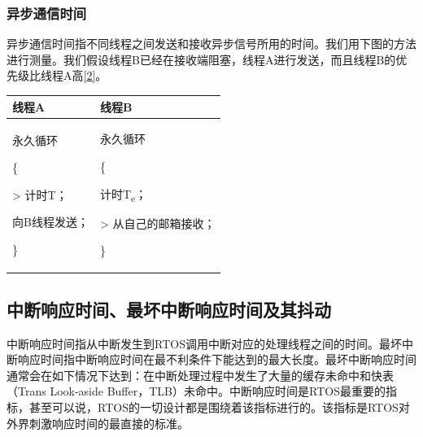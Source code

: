 \subsubsection{异步通信时间}\label{subsubsec:asynchronous-communication-time}

异步通信时间指不同线程之间发送和接收异步信号所用的时间。我们用下图的方法进行测量。我们假设线程B已经在接收端阻塞，线程A进行发送，而且线程B的优先级比线程A高\hyperref[sec:chapter-bibliography-2]{{[}2{]}}。

\label{tab:asynchronous-communication-between-threads}

{\def\LTcaptype{none} %
\begin{longtable}[]{@{}
  >{\raggedright\arraybackslash}p{}
  >{\raggedright\arraybackslash}p{}@{}}
\toprule\noalign{}
\begin{minipage}[b]{\linewidth}\raggedright
线程A
\end{minipage} & \begin{minipage}[b]{\linewidth}\raggedright
线程B
\end{minipage} \\
\midrule\noalign{}
\endhead
\bottomrule\noalign{}
\endlastfoot
永久循环

\{

\textgreater{} 计时T；

向B线程发送；

\} & 永久循环

\{

计时T\textsubscript{e}；

\textgreater{} 从自己的邮箱接收；

\} \\
\end{longtable}
}

\subsection{中断响应时间、最坏中断响应时间及其抖动}\label{subsec:interrupt-response-time-worst-case-response-time-and-jitter}

中断响应时间指从中断发生到RTOS调用中断对应的处理线程之间的时间。最坏中断响应时间指中断响应时间在最不利条件下能达到的最大长度。最坏中断响应时间通常会在如下情况下达到：在中断处理过程中发生了大量的缓存未命中和快表（Trans
Look-aside
Buffer，TLB）未命中。中断响应时间是RTOS最重要的指标，甚至可以说，RTOS的一切设计都是围绕着该指标进行的。该指标是RTOS对外界刺激响应时间的最直接的标准。

